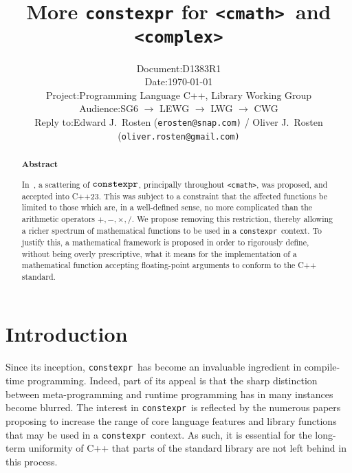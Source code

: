 \documentclass[prd,twocolumn,amsmath,amssymb,nofootinbib,eqsecnum]{revtex4-1}
\newcommand{\constexpr}{\code{constexpr}\xspace}
\newcommand{\code}[1]{{\tt #1}}
\newcommand{\header}[1]{{\tt <#1>}}
\newcommand{\cmath}{\header{cmath}}
\newcommand{\complex}{\header{complex}}
\newcommand{\Operators}{\ensuremath{+,-,\times,/}}
\begin{document}
\title{More \constexpr for \cmath\ and \complex}

\author{
\hspace{11.5em}
\begin{tabular}{ll}
	Document: & D1383R1
\\
	Date: & \today
\\
	Project: & Programming Language C++, Library Working Group
\\
	Audience: & SG6 $\rightarrow$ LEWG $\rightarrow$ LWG $\rightarrow$ CWG
\\
	Reply to: & Edward J.\ Rosten {(\tt erosten@snap.com)}
 / Oliver J.\ Rosten {(\tt oliver.rosten@gmail.com)}
\end{tabular}
}

\begin{abstract}

\begin{center} {\bf Abstract} \end{center}

In~\cite{Rosten-constexpr}, a scattering of $\constexpr$, principally throughout \cmath, was proposed, and accepted into C++23. This was subject to a constraint that the affected functions be limited to those which are, in a well-defined sense, no more complicated than the arithmetic operators \Operators. We propose removing this restriction, thereby allowing a richer spectrum of mathematical functions to be used in a \constexpr\ context. To justify this, a mathematical framework is proposed in order to rigorously define, without being overly prescriptive, what it means for the implementation of a mathematical function accepting floating-point arguments to conform to the C++ standard.
	
\end{abstract}


\maketitle
\tableofcontents

\section{Introduction}

Since its inception, \constexpr\ has become an invaluable ingredient in compile-time programming. Indeed, part of its appeal is that the sharp distinction between meta-programming and runtime programming has in many instances become blurred. The interest in \constexpr\ is reflected by the numerous papers proposing to increase the range of core language features and library functions that may be used in a \constexpr\ context. As such, it is essential for the long-term uniformity of C++ that parts of the standard library are not left behind in this process.
\end{document}

